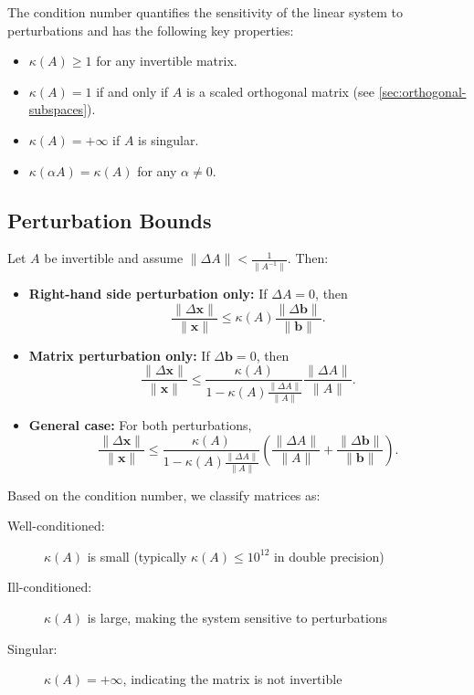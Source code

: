 The condition number quantifies the sensitivity of the linear system to perturbations and has the following key properties:
\begin{itemize}
    \item $\kappa(A) \geq 1$ for any invertible matrix.
    \item $\kappa(A) = 1$ if and only if $A$ is a scaled orthogonal matrix (see \autoref{sec:orthogonal-subspaces}).
    \item $\kappa(A) = +\infty$ if $A$ is singular.
    \item $\kappa(\alpha A) = \kappa(A)$ for any $\alpha \neq 0$.
\end{itemize}

\subsection{Perturbation Bounds}
Let $A$ be invertible and assume $\|\Delta A\| < \frac{1}{\|A^{-1}\|}$. Then:
\begin{itemize}
    \item \textbf{Right-hand side perturbation only:} If $\Delta A = 0$, then
          \[
              \frac{\|\Delta \mathbf{x}\|}{\|\mathbf{x}\|} \leq \kappa(A) \frac{\|\Delta \mathbf{b}\|}{\|\mathbf{b}\|}.
          \]
    \item \textbf{Matrix perturbation only:} If $\Delta \mathbf{b} = 0$, then
          \[
              \frac{\|\Delta \mathbf{x}\|}{\|\mathbf{x}\|} \leq \frac{\kappa(A)}{1 - \kappa(A)\frac{\|\Delta A\|}{\|A\|}} \frac{\|\Delta A\|}{\|A\|}.
          \]

    \item \textbf{General case:} For both perturbations,
          \[
              \frac{\|\Delta \mathbf{x}\|}{\|\mathbf{x}\|} \leq \frac{\kappa(A)}{1 - \kappa(A)\frac{\|\Delta A\|}{\|A\|}} \left( \frac{\|\Delta A\|}{\|A\|} + \frac{\|\Delta \mathbf{b}\|}{\|\mathbf{b}\|} \right).
          \]
\end{itemize}

Based on the condition number, we classify matrices as:

\begin{description}
    \item[Well-conditioned:] $\kappa(A)$ is small (typically $\kappa(A) \leq 10^{12}$ in double precision)
    \item[Ill-conditioned:] $\kappa(A)$ is large, making the system sensitive to perturbations
    \item[Singular:] $\kappa(A) = +\infty$, indicating the matrix is not invertible
\end{description}

